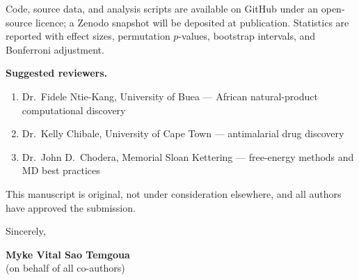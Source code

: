 \documentclass[11pt,letterpaper]{article}
\begin{document}
Code, source data, and analysis scripts are available on GitHub under an open-source licence; a Zenodo snapshot will be deposited at publication. Statistics are reported with effect sizes, permutation $p$-values, bootstrap intervals, and Bonferroni adjustment.

\noindent\textbf{Suggested reviewers.}
\begin{enumerate}
  \item Dr.\ Fidele Ntie-Kang, University of Buea --- African natural-product computational discovery
  \item Dr.\ Kelly Chibale, University of Cape Town --- antimalarial drug discovery
  \item Dr.\ John D.\ Chodera, Memorial Sloan Kettering --- free-energy methods and MD best practices
\end{enumerate}

\noindent This manuscript is original, not under consideration elsewhere, and all authors have approved the submission.

\vspace{1em}

\noindent Sincerely,

\vspace{1em}

\noindent \textbf{Myke Vital Sao Temgoua} \\
(on behalf of all co-authors)
\end{document}
